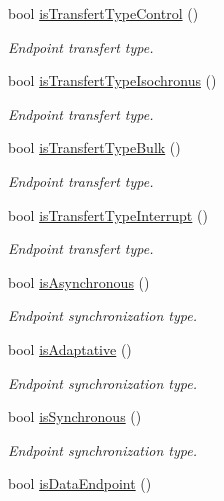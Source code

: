 \begin{DoxyCompactItemize}
bool \hyperlink{classmdt_usb_endpoint_descriptor_a98313de5a27b8d9f21dd626a03fa9d3f}{is\-Transfert\-Type\-Control} ()
\begin{DoxyCompactList}\small\item\em Endpoint transfert type. \end{DoxyCompactList}\item 
bool \hyperlink{classmdt_usb_endpoint_descriptor_a4e70988edb576768b41a9d2c3093c62e}{is\-Transfert\-Type\-Isochronus} ()
\begin{DoxyCompactList}\small\item\em Endpoint transfert type. \end{DoxyCompactList}\item 
bool \hyperlink{classmdt_usb_endpoint_descriptor_a7bb6ffc5624d3059289a00da48632e93}{is\-Transfert\-Type\-Bulk} ()
\begin{DoxyCompactList}\small\item\em Endpoint transfert type. \end{DoxyCompactList}\item 
bool \hyperlink{classmdt_usb_endpoint_descriptor_a25f980aace01311474813f588d1618df}{is\-Transfert\-Type\-Interrupt} ()
\begin{DoxyCompactList}\small\item\em Endpoint transfert type. \end{DoxyCompactList}\item 
bool \hyperlink{classmdt_usb_endpoint_descriptor_a9e758fcd2f85d4a41a7a95241585ce29}{is\-Asynchronous} ()
\begin{DoxyCompactList}\small\item\em Endpoint synchronization type. \end{DoxyCompactList}\item 
bool \hyperlink{classmdt_usb_endpoint_descriptor_a4547eeba32592fc49d56c73a53c49584}{is\-Adaptative} ()
\begin{DoxyCompactList}\small\item\em Endpoint synchronization type. \end{DoxyCompactList}\item 
bool \hyperlink{classmdt_usb_endpoint_descriptor_a83d8d0ae021ca27067044a6ecc72cff6}{is\-Synchronous} ()
\begin{DoxyCompactList}\small\item\em Endpoint synchronization type. \end{DoxyCompactList}\item 
bool \hyperlink{classmdt_usb_endpoint_descriptor_af7f74090d6964f908fb556a04853c873}{is\-Data\-Endpoint} ()

\end{DoxyCompactItemize}
